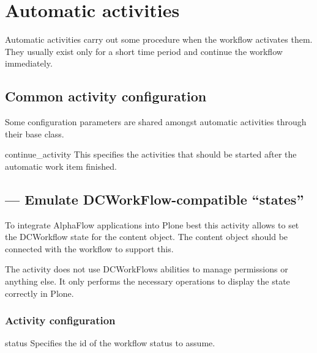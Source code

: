 \section{Automatic activities}
    
 Automatic activities carry out some procedure when the workflow activates
 them. They usually exist only for a short time period and continue the
 workflow immediately.
  
 \subsection{Common activity configuration}
    
 Some configuration parameters are shared amongst automatic activities through
 their base class. 

 \begin{memberdesc}{continue\_activity}
     This specifies the activities that should be started after the automatic work item
     finished.
 \end{memberdesc}

 \subsection{ --- Emulate DCWorkFlow-compatible ``states''}
 
  
    To integrate AlphaFlow applications into Plone best this activity allows to
    set the DCWorkflow state for the content object. The content object should
    be connected with the  workflow to support this.

    The  activity does not use DCWorkFlows abilities to
    manage permissions or anything else. It only performs the necessary
    operations to display the state correctly in Plone.
 
    \subsubsection{Activity configuration}

     \begin{memberdesc}{status}
        Specifies the id of the workflow status to assume.
     \end{memberdesc}

